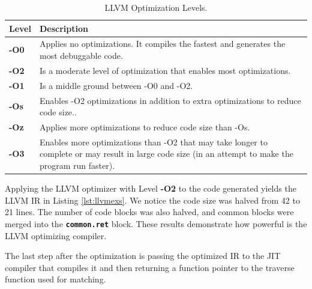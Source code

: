 {\renewcommand{\arraystretch}{1.1}%
\begin{table}[H]
\centering
\small
\begin{tabularx}{\textwidth}{|l|X|}
\hline
Level        & Description  \\
\hline
\textbf{-O0} & Applies no optimizations. It compiles the fastest and generates the most debuggable code.\\
\hline
\textbf{-O2} & Is a moderate level of optimization that enables most optimizations.\\
\hline
\textbf{-O1} & Is a middle ground between -O0 and -O2.\\
\hline
\textbf{-Os} & Enables -O2 optimizations in addition to extra optimizations to reduce code size..\\
\hline
\textbf{-Oz} & Applies more optimizations to reduce code size than -Os.\\
\hline
\textbf{-O3} & Enables more optimizations than -O2 that may take longer to complete or may result in large code size (in an attempt to make the program run faster).\\
\hline
\end{tabularx}
\caption[LLVM Optimization Levels]{LLVM Optimization Levels.}\label{tab:optlevels}
\end{table}}

Applying the LLVM optimizer with Level \textbf{-O2} to the code generated yields the LLVM IR in Listing \ref{lst:llvmexs}. We notice the code size was halved from 42 to 21 lines. The number of code blocks was also halved, and common blocks were merged into the \texttt{\textbf{common.ret}} block. These results demonstrate how powerful is the LLVM optimizing compiler.

The last step after the optimization is passing the optimized IR to the JIT compiler that compiles it and then returning a function pointer to the traverse function used for matching.

